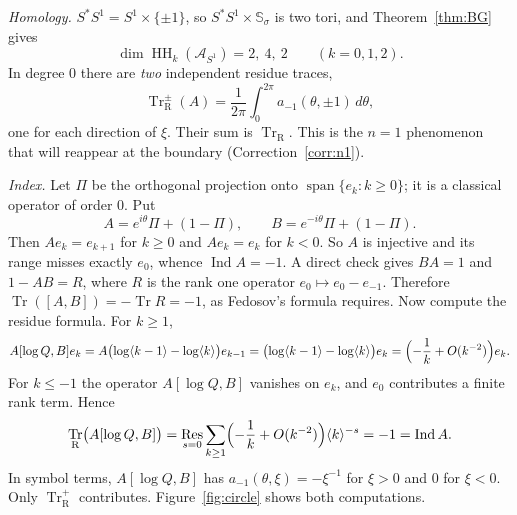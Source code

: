 \documentclass[11pt,oneside,reqno]{article}
\DeclareMathOperator{\HH}{HH}
\DeclareMathOperator{\Tr}{Tr}
\DeclareMathOperator{\Ind}{Ind}
\DeclareMathOperator{\Res}{Res}
\newcommand{\cA}{\mathcal A}
\newcommand{\TrR}{\Tr_{\mathrm R}}
\newcommand{\Ssig}{\mathbb S_\sigma}
\newcommand{\lQ}{\log Q}
\theoremstyle{plain}
\theoremstyle{definition}
\theoremstyle{remark}
\begin{document}
\emph{Homology.} \(S^*S^1=S^1\times\{\pm1\}\), so
\(S^*S^1\times\Ssig\) is two tori, and Theorem~\ref{thm:BG} gives
\[
 \dim\HH_k(\cA_{S^1})=2,\ 4,\ 2\qquad(k=0,1,2).
\]
In degree \(0\) there are \emph{two} independent residue traces,
\[
 \TrR^\pm(A)=\frac1{2\pi}\int_0^{2\pi}a_{-1}(\theta,\pm1)\,d\theta ,
\]
one for each direction of \(\xi\). Their sum is \(\TrR\). This is the
\(n=1\) phenomenon that will reappear at the boundary
(Correction~\ref{corr:n1}).

\emph{Index.} Let \(\Pi\) be the orthogonal projection onto
\(\operatorname{span}\{e_k:k\ge0\}\); it is a classical operator of order
\(0\). Put
\[
 A=e^{i\theta}\Pi+(1-\Pi),\qquad B=e^{-i\theta}\Pi+(1-\Pi).
\]
Then \(Ae_k=e_{k+1}\) for \(k\ge0\) and \(Ae_k=e_k\) for \(k<0\). So \(A\)
is injective and its range misses exactly \(e_0\), whence \(\Ind A=-1\).
A direct check gives \(BA=1\) and \(1-AB=R\), where \(R\) is the rank one
operator \(e_0\mapsto e_0-e_{-1}\). Therefore
\(\Tr([A,B])=-\Tr R=-1\), as Fedosov's formula requires. Now compute the
residue formula. For \(k\ge1\),
\[
 A[\lQ,B]e_k=A\bigl(\log\langle k-1\rangle-\log\langle k\rangle\bigr)e_{k-1}
 =\bigl(\log\langle k-1\rangle-\log\langle k\rangle\bigr)e_k
 =\Bigl(-\frac1k+O(k^{-2})\Bigr)e_k .
\]
For \(k\le-1\) the operator \(A[\lQ,B]\) vanishes on \(e_k\), and \(e_0\)
contributes a finite rank term. Hence
\[
 \TrR\bigl(A[\lQ,B]\bigr)=\Res_{s=0}\sum_{k\ge1}\Bigl(-\frac1k+O(k^{-2})
 \Bigr)\langle k\rangle^{-s}=-1=\Ind A .
\]
In symbol terms, \(A[\lQ,B]\) has \(a_{-1}(\theta,\xi)=-\xi^{-1}\) for
\(\xi>0\) and \(0\) for \(\xi<0\). Only \(\TrR^+\) contributes.
Figure~\ref{fig:circle} shows both computations.
\end{document}
